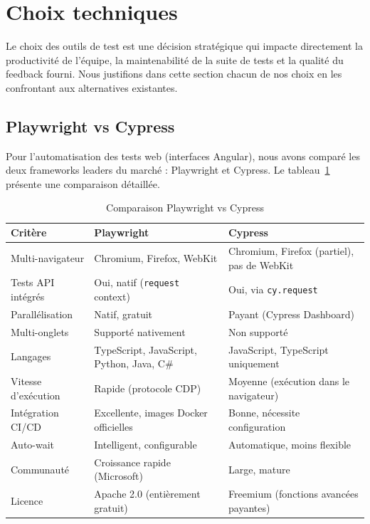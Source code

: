 \section{Choix techniques}
\label{sec:choix-techniques}

Le choix des outils de test est une décision stratégique qui impacte directement la productivité de l'équipe, la maintenabilité de la suite de tests et la qualité du feedback fourni. Nous justifions dans cette section chacun de nos choix en les confrontant aux alternatives existantes.

\subsection{Playwright vs Cypress}
\label{subsec:playwright-vs-cypress}

Pour l'automatisation des tests web (interfaces Angular), nous avons comparé les deux frameworks leaders du marché : Playwright et Cypress. Le tableau~\ref{tab:playwright-vs-cypress} présente une comparaison détaillée.

\begin{table}[H]
\centering
\caption{Comparaison Playwright vs Cypress}
\label{tab:playwright-vs-cypress}
\renewcommand{\arraystretch}{1.3}
\begin{tabularx}{\textwidth}{|l|X|X|}
\hline
\rowcolor{speedlineBlue!15}
\textbf{Critère} & \textbf{Playwright} & \textbf{Cypress} \\
\hline
Multi-navigateur & Chromium, Firefox, WebKit & Chromium, Firefox (partiel), pas de WebKit \\
\hline
Tests API intégrés & Oui, natif (\texttt{request} context) & Oui, via \texttt{cy.request} \\
\hline
Parallélisation & Natif, gratuit & Payant (Cypress Dashboard) \\
\hline
Multi-onglets & Supporté nativement & Non supporté \\
\hline
Langages & TypeScript, JavaScript, Python, Java, C\# & JavaScript, TypeScript uniquement \\
\hline
Vitesse d'exécution & Rapide (protocole CDP) & Moyenne (exécution dans le navigateur) \\
\hline
Intégration CI/CD & Excellente, images Docker officielles & Bonne, nécessite configuration \\
\hline
Auto-wait & Intelligent, configurable & Automatique, moins flexible \\
\hline
Communauté & Croissance rapide (Microsoft) & Large, mature \\
\hline
Licence & Apache 2.0 (entièrement gratuit) & Freemium (fonctions avancées payantes) \\
\hline
\end{tabularx}
\end{table}

